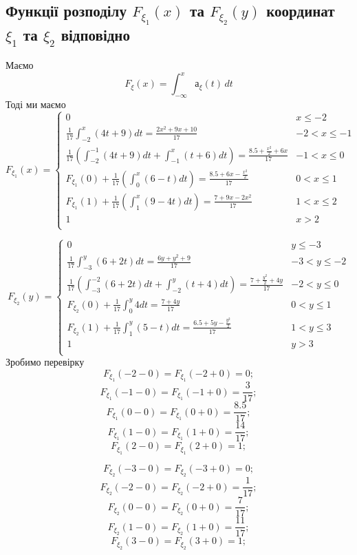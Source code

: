 \documentclass{article}
\begin{document}
	\subsection{ Функції розподілу $F_{\xi_1}(x)$ та $F_{\xi_2}(y)$ координат $\xi_1$ та $\xi_2$ відповідно}
	Маємо 
	\[
	F_{\xi}(x) = \int_{-\infty}^xа_{\xi}(t)\,dt
	\]
	Тоді ми маємо
	\[
	F_{\xi_1}(x) = 
	\begin{cases}
		0 & x \leq -2 \\
		\frac{1}{17}\int_{-2}^x(4t+9)dt = \frac{2x^2+9x + 10}{17} & -2 < x \leq -1 \\
		\frac{1}{17}(\int_{-2}^{-1}(4t+9)dt + \int_{-1}^x(t+6)dt) = \frac{8.5 + \frac{x^2}{2}+6x}{17} & -1 < x \leq 0 \\
		F_{\xi_1}(0) + \frac{1}{17}(\int_{0}^x(6-t)dt) = \frac{8.5 + 6x - \frac{x^2}{2} }{17} & 0 < x \leq 1 \\
		 F_{\xi_1}(1) + \frac{1}{17}(\int_1^x (9-4t)dt) = \frac{7 + 9x - 2x^2}{17} & 1 < x \leq 2 \\
		 1 & x > 2 \\
	\end{cases}
	\]
	
	\[
	F_{\xi_2}(y) =
	\begin{cases}
		0 & y \leq -3 \\
		\frac{1}{17}\int_{-3}^y(6 + 2t)dt = \frac{6y+y^2+9}{17} & -3 < y \leq -2 \\
		\frac{1}{17}(\int_{-3}^{-2}(6 + 2t)dt + \int_{-2}^y(t+4)dt) = \frac{7 + \frac{y^2}{2} + 4y}{17} & -2 < y \leq 0 \\
		F_{\xi_2}(0) + \frac{1}{17}\int_{0}^{y}4dt = \frac{7+4y}{17} & 0 < y \leq 1 \\
		F_{\xi_2}(1) + \frac{1}{17}\int_{1}^{y}(5-t)dt = \frac{6.5 + 5y - \frac{y^2}{2}}{17} & 1 < y \leq 3 \\
		1 & y > 3 \\
	\end{cases} 
	\]
	Зробимо перевірку
	\[
	F_{\xi_1}(-2-0) = F_{\xi_1}(-2+0) = 0;
	\]
	\[
	F_{\xi_1}(-1-0) = F_{\xi_1}(-1+0) = \frac{3}{17};
	\]
	\[
	F_{\xi_1}(0-0) = F_{\xi_1}(0+0) = \frac{8.5}{17};
	\]
	\[
	F_{\xi_1}(1-0) = F_{\xi_1}(1+0) = \frac{14}{17};
	\]
	\[
	F_{\xi_1}(2-0) = F_{\xi_1}(2+0) = 1;
	\]
	
	\bigskip
	
	\[
	F_{\xi_2}(-3-0) = F_{\xi_2}(-3+0) = 0;
	\]
	\[
	F_{\xi_2}(-2-0) = F_{\xi_2}(-2+0) = \frac{1}{17};
	\]
	\[
	F_{\xi_2}(0-0) = F_{\xi_2}(0+0) = \frac{7}{17};
	\]
	\[
	F_{\xi_2}(1-0) = F_{\xi_2}(1+0) = \frac{11}{17};
	\]
	\[
	F_{\xi_2}(3-0) = F_{\xi_2}(3+0) = 1;
	\]
	
\end{document}
